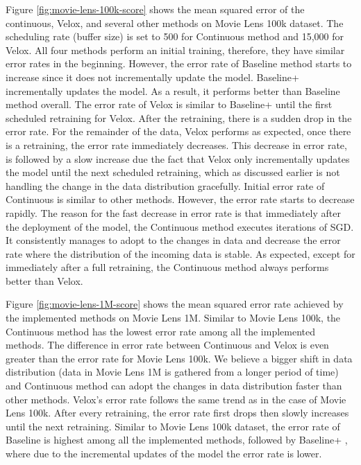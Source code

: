 \documentclass{vldb}
\begin{document}
Figure \ref{fig:movie-lens-100k-score} shows the mean squared error of the continuous, Velox, and several other methods on Movie Lens 100k dataset.
The scheduling rate (buffer size) is set to 500 for Continuous method and 15,000 for Velox.
All four methods perform an initial training, therefore, they have similar error rates in the beginning.
However, the error rate of Baseline method starts to increase since it does not incrementally update the model.
Baseline+ incrementally updates the model.
As a result, it performs better than Baseline method overall.
The error rate of Velox is similar to Baseline+ until the first scheduled retraining for Velox.
After the retraining, there is a sudden drop in the error rate.
For the remainder of the data, Velox performs as expected, once there is a retraining, the error rate immediately decreases.
This decrease in error rate, is followed by a slow increase due the fact that Velox only incrementally updates the model until the next scheduled retraining, which as discussed earlier is not handling the change in the data distribution gracefully.
Initial error rate of Continuous is similar to other methods.
However, the error rate starts to decrease rapidly.
The reason for the fast decrease in error rate is that immediately after the deployment of the model, the Continuous method executes iterations of SGD.
It consistently manages to adopt to the changes in data and decrease the error rate where the distribution of the incoming data is stable.
As expected, except for immediately after a full retraining, the Continuous method always performs better than Velox.

Figure \ref{fig:movie-lens-1M-score} shows the mean squared error rate achieved by the implemented methods on Movie Lens 1M.
Similar to Movie Lens 100k, the Continuous method has the lowest error rate among all the implemented methods.
The difference in error rate between Continuous and Velox is even greater than the error rate for Movie Lens 100k.
We believe a bigger shift in data distribution (data in Movie Lens 1M is gathered from a longer period of time) and Continuous method can adopt the changes in data distribution faster than other methods.
Velox's error rate follows the same trend as in the case of Movie Lens 100k. 
After every retraining, the error rate first drops then slowly increases until the next retraining.
Similar to Movie Lens 100k dataset, the error rate of Baseline is highest among all the implemented methods, followed by Baseline+ , where due to the incremental updates of the model the error rate is lower.
\end{document}
